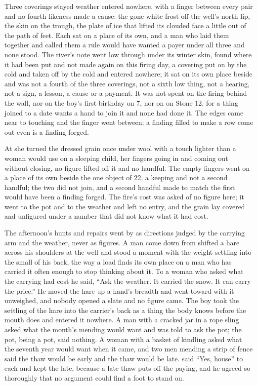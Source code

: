 Three coverings stayed weather entered nowhere, with a finger between every pair and no fourth likeness made a cause: the gone white frost off the well's north lip, the skin on the trough, the plate of ice that lifted its clouded face a little out of the path of feet. Each sat on a place of its own, and a man who laid them together and called them a rule would have wanted a payer under all three and none stood. The river's note went low through  under its winter skin, found where it had been put and not made again on this firing day, a covering put on by the cold and taken off by the cold and entered nowhere; it sat on its own place beside  and was not a fourth of the three coverings, not a sixth low thing, not a hearing, not a sign, a lesson, a cause or a payment. It was not spent on the firing behind the wall, nor on the boy's first birthday on  7, nor on  on Stone 12, for a thing joined to a date wants a hand to join it and none had done it. The edges came near to touching and the finger went between; a finding filled to make a row come out even is a finding forged.

At  she turned the dressed grain once under wool with a touch lighter than a woman would use on a sleeping child, her fingers going in and coming out without closing, no figure lifted off it and no handful. The empty fingers went on a place of its own beside the one object of  22, a keeping and not a second handful; the two did not join, and a second handful made to match the first would have been a finding forged. The fire's cost was asked of no figure here; it went to the pot and to the weather and left no entry, and the grain lay covered and unfigured under a number that did not know what it had cost.

\scenebreak

The afternoon's hunts and repairs went by as directions judged by the carrying arm and the weather, never as figures. A man come down from  shifted a hare across his shoulders at the well and stood a moment with the weight settling into the small of his back, the way a load finds its own place on a man who has carried it often enough to stop thinking about it. To a woman who asked what the carrying had cost he said, “Ask the weather. It carried the snow. It can carry the price.” He moved the hare up a hand's breadth and went toward  with it unweighed, and nobody opened a slate and no figure came. The boy took the settling of the hare into the carrier's back as a thing the body knows before the mouth does and entered it nowhere. A man with a cracked jar in a rope sling asked what the month's mending would want and was told to ask the pot; the pot, being a pot, said nothing. A woman with a basket of kindling asked what the seventh year would want when it came, and two men mending a strip of fence said the thaw would be early and the thaw would be late.  said “Yes, house” to each and kept the late, because a late thaw puts off the paying, and he agreed so thoroughly that no argument could find a foot to stand on.

